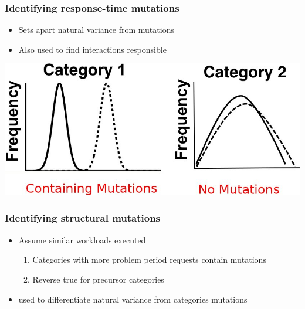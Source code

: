 \documentclass[11pt]{beamer}
\begin{document}
\begin{frame}
\frametitle{Identifying response-time mutations}
\begin{itemize}
  \item Sets apart natural variance from mutations
  \item Also used to find interactions responsible
\end{itemize}
\begin{center}
\includegraphics[width=.7\textwidth]{fig/mutation1.jpg}
\end{center}
\end{frame}

\begin{frame}
\frametitle{Identifying structural mutations}
\begin{itemize}
  \item Assume similar workloads executed
  \begin{enumerate}
    \item Categories with more problem period requests contain mutations
    \item Reverse true for precursor categories
  \end{enumerate}
  \vskip11pt
  \item {} used to differentiate natural
  variance from categories mutations
\end{itemize}
\end{frame}
\end{document}
